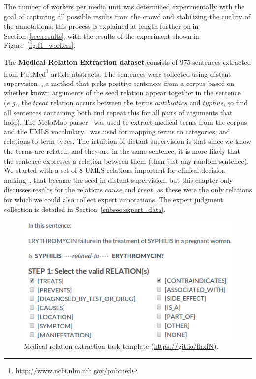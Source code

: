 The number of workers per media unit was determined experimentally with the goal of capturing all possible results from the crowd and stabilizing the quality of the annotations; this process is explained at length further on in Section~\ref{sec:results}, with the results of the experiment shown in Figure~\ref{fig:f1_workers}.

The \textbf{Medical Relation Extraction dataset} consists of 975 sentences extracted from PubMed\footnote{\url{http://www.ncbi.nlm.nih.gov/pubmed}} article abstracts. The sentences were collected using distant supervision~\cite{mintz2009distant}, a method that picks positive sentences from a corpus based on whether known arguments of the seed relation appear together in the sentence (\emph{e.g.}, the $treat$ relation occurs between the terms $antibiotics$ and $typhus$, so find all sentences containing both and repeat this for all pairs of arguments that hold). The MetaMap parser~\cite{aronson2001effective} was used to extract medical terms from the corpus and the UMLS vocabulary~\cite{bodenreider2004unified} was used for mapping terms to categories, and relations to term types. The intuition of distant supervision is that since we know the terms are related, and they are in the same sentence, it is more likely that the sentence expresses a relation between them (than just any random sentence). We started with a set of 8 UMLS relations important for clinical decision making~\cite{P14-1078}, that became the seed in distant supervision, but this chapter only discusses results for the relations $cause$ and $treat$, as these were the only relations for which we could also collect expert annotations. The expert judgment collection is detailed in Section~\ref{subsec:expert_data}.

\begin{figure}[htb!]
\centering
\includegraphics[width=0.8\linewidth]{img/relex}
\caption{Medical relation extraction task template (\url{https://git.io/fhxfN}).}
\label{fig:screenshot_medical}
\end{figure}

